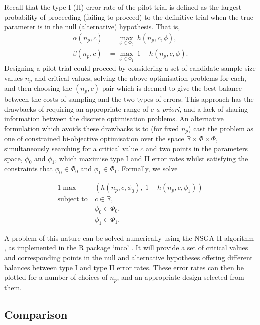 \documentclass[AMA,STIX1COL]{WileyNJD-v2}
\begin{document}
Recall that the type I (II) error rate of the pilot trial is defined as the largest probability of proceeding (failing to proceed) to the definitive trial when the true parameter is in the null (alternative) hypothesis. That is, 
\begin{align*}
\alpha(n_p, c) &= \max_{\phi \in \Phi_0} ~ h(n_p, c, \phi) , \\
\beta(n_p, c) &= \max_{\phi \in \Phi_1}  ~ 1 - h(n_p, c, \phi).
\end{align*}
Designing a pilot trial could proceed by considering a set of candidate sample size values $n_p$ and critical values, solving the above optimisation problems for each, and then choosing the $(n_p, c)$ pair which is deemed to give the best balance between the costs of sampling and the two types of errors. This approach has the drawbacks of requiring an appropriate range of $c$ \emph{a priori}, and a lack of sharing information between the discrete optimisation problems. An alternative formulation which avoids these drawbacks is to (for fixed $n_p$) cast the problem as one of constrained bi-objective optimisation over the space $\mathbb{R} \times \Phi \times \Phi$, simultaneously searching for a critical value $c$ and two points in the parameters space, $\phi_0$ and $\phi_1$, which maximise type I and II error rates whilst satisfying the constraints that $\phi_0 \in \Phi_0$ and $\phi_1 \in \Phi_1$. Formally, we solve

\begin{alignat}{1}\label{eqn:MO_opt}
\max ~ & \left( h(n_p, c, \phi_0) , ~ 1 - h(n_p, c, \phi_1)  \right) \\
\text{subject to} ~ & c \in \mathbb{R}, \nonumber \\ 
& \phi_0 \in \Phi_0, \nonumber  \\
& \phi_1 \in \Phi_1. \nonumber 
\end{alignat}

A problem of this nature can be solved numerically using the NSGA-II algorithm \cite{Deb2002}, as implemented in the R package `mco' \cite{Mersmann2014}. It will provide a set of critical values and corresponding points in the null and alternative hypotheses offering different balances between type I and type II error rates. These error rates can then be plotted for a number of choices of $n_p$, and an appropriate design selected from them.

\subsection{Comparison}
\end{document}
